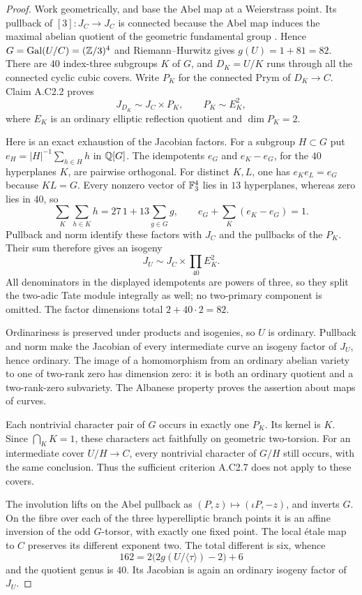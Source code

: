 \begin{proof}
Work geometrically, and base the Abel map at a Weierstrass point.
Its pullback of $[3]:J_C\to J_C$ is connected because the Abel
map induces the maximal abelian quotient of the geometric
fundamental group \citep[III, Proposition 9.1]{A_Milne2008}.
Hence $G=\operatorname{Gal}(U/C)=(\mathbb Z/3)^4$ and Riemann--Hurwitz gives
$g(U)=1+81=82$. There are $40$ index-three subgroups $K$ of
$G$, and $D_K=U/K$ runs through all the connected cyclic cubic
covers. Write $P_K$ for the connected Prym of $D_K\to C$.
Claim A.C2.2 proves
\[
  J_{D_K}\sim J_C\times P_K,\qquad P_K\sim E_K^2,
\]
where $E_K$ is an ordinary elliptic reflection quotient and
$\dim P_K=2$.

Here is an exact exhaustion of the Jacobian factors. For a subgroup
$H\subset G$ put $e_H=|H|^{-1}\sum_{h\in H}h$ in $\mathbb Q[G]$.
The idempotents $e_G$ and $e_K-e_G$, for the $40$ hyperplanes
$K$, are pairwise orthogonal. For distinct $K,L$, one has
$e_Ke_L=e_G$ because $KL=G$. Every nonzero vector of $\mathbb F_3^4$
lies in $13$ hyperplanes, whereas zero lies in $40$, so
\[
 \sum_K\sum_{h\in K}h=27\,1+13\sum_{g\in G}g,
 \qquad e_G+\sum_K(e_K-e_G)=1.
\]
Pullback and norm identify these factors with $J_C$ and the
pullbacks of the $P_K$. Their sum therefore gives an isogeny
\[
                  J_U\sim J_C\times\prod_{40}E_K^2.       \tag{C2.24}
\]
All denominators in the displayed idempotents are powers of three,
so they split the two-adic Tate module integrally as well; no
two-primary component is omitted. The factor dimensions total
$2+40\cdot2=82$.

Ordinariness is preserved under products and isogenies, so $U$ is
ordinary. Pullback and norm make the Jacobian of every intermediate
curve an isogeny factor of $J_U$, hence ordinary. The image of a
homomorphism from an ordinary abelian variety to one of two-rank
zero has dimension zero: it is both an ordinary quotient and a
two-rank-zero subvariety. The Albanese property proves the assertion
about maps of curves.

Each nontrivial character pair of $G$ occurs in exactly one $P_K$.
Its kernel is $K$. Since $\bigcap_K K=1$, these characters act
faithfully on geometric two-torsion. For an intermediate cover
$U/H\to C$, every nontrivial character of $G/H$ still occurs,
with the same conclusion. Thus the sufficient criterion A.C2.7
does not apply to these covers.

The involution lifts on the Abel pullback as
$(P,z)\mapsto(\iota P,-z)$, and inverts $G$. On the fibre over
each of the three hyperelliptic branch points it is an affine
inversion of the odd $G$-torsor, with exactly one fixed point.
The local \'etale map to $C$ preserves its different exponent two.
The total different is six, whence
\[
 162=2\bigl(2g(U/\langle\tau\rangle)-2\bigr)+6
\]
and the quotient genus is $40$. Its Jacobian is again an ordinary
isogeny factor of $J_U$.


\end{proof}
